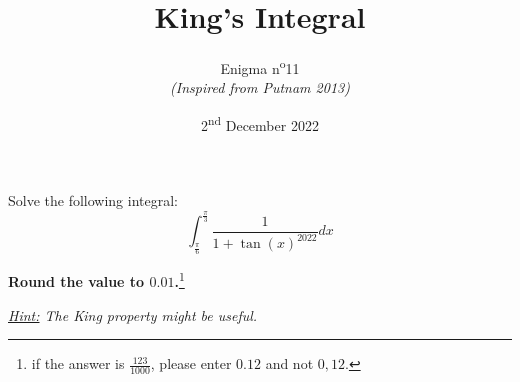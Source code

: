 \documentclass[a4paper, top=10mm]{article}
\title{\textbf{\huge{King's Integral}}}
\author{Enigma n\textsuperscript{o}11\\\textit{(Inspired from Putnam 2013)}}
\date{2\textsuperscript{nd} December 2022}
\begin{document}
	\maketitle
	
	Solve the following integral:
	$$\int_{\frac{\pi}{6}}^{\frac{\pi}{3}} \frac{1}{1+\tan(x)^{2022}} dx$$
	
	\vspace{1cm}
	
	\textbf{Round the value to $0.01$.}\footnote{if the answer is $\frac{123}{1000}$, please enter $0.12$ and not $0,12$.}
	
	\vspace{1cm}
	
	\textit{\underline{Hint:} The King property might be useful.}
	
\end{document}

